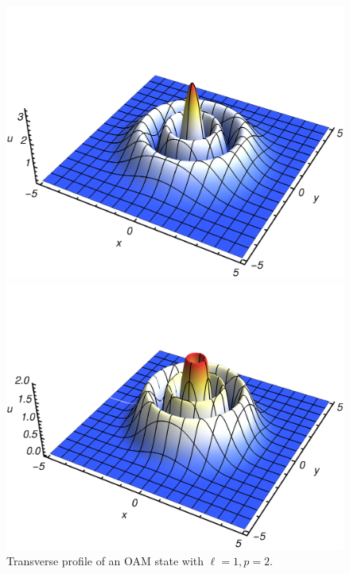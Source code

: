 \begin{figure}
    \centering
    \begin{minipage}{0.49\textwidth}
        \centering
        \includegraphics[width=1\textwidth]{Figures/OAM/OAM_fig_1.pdf}
        \caption{
        	Transverse profile of an OAM state with $\ell=0, p=2$.
        }
        \label{fig:expQWs:LG_profile_L0P2Z03}
    \end{minipage}\hfill
    \begin{minipage}{0.49\textwidth}
        \centering
        \includegraphics[width=1\textwidth]{Figures/OAM/OAM_fig_2.pdf}
        \caption{
        	Transverse profile of an OAM state with $\ell=1, p=2$.
        }
        \label{fig:expQWs:LG_profile_L1P2Z03}
    \end{minipage}
\end{figure}

